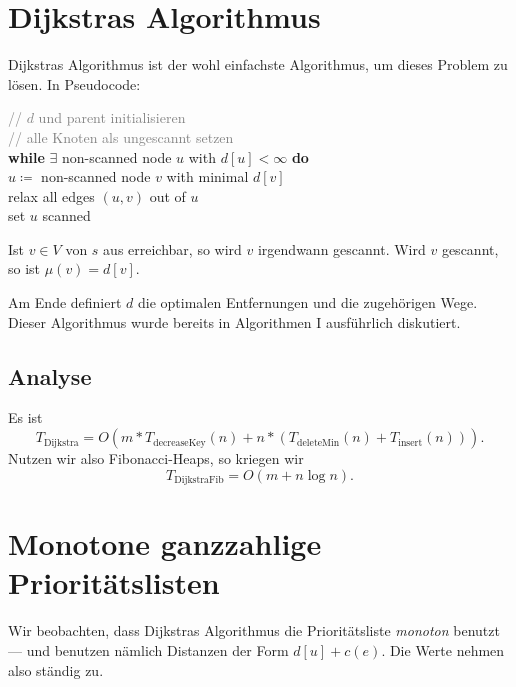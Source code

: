 \section{Dijkstras Algorithmus}

Dijkstras Algorithmus ist der wohl einfachste Algorithmus, um dieses Problem zu lösen. In Pseudocode:

\begin{pseudocode}
  \textcolor{gray}{// \( d \) und parent initialisieren} \\
  \textcolor{gray}{// alle Knoten als ungescannt setzen} \\
  \textbf{while} \( \exists \) non-scanned node \( u \) with \( d[u] < \infty \) \textbf{do} \\
  \phantom{\enskip} \( u \coloneqq \) non-scanned node \( v \) with minimal \( d[v] \) \\
  \phantom{\enskip} relax all edges \( (u,v) \) out of \( u \) \\
  \phantom{\enskip} set \( u \) scanned
\end{pseudocode}

Ist \( v \in V \) von \( s \) aus erreichbar, so wird \( v \) irgendwann gescannt. Wird \( v \) gescannt, so ist \( \mu(v) = d[v] \).

Am Ende definiert \( d \) die optimalen Entfernungen und  die zugehörigen Wege. Dieser Algorithmus wurde bereits in Algorithmen I ausführlich diskutiert.

\subsection{Analyse}

Es ist
\begin{equation*}
  T_{\text{Dijkstra}} = O(m*T_\text{decreaseKey}(n) + n*(T_\text{deleteMin}(n) + T_\text{insert}(n)))\text{.}
\end{equation*}
Nutzen wir also Fibonacci-Heaps, so kriegen wir
\begin{equation*}
  T_\text{DijkstraFib} = O(m+n\log n)\text{.}
\end{equation*}

\section{Monotone ganzzahlige Prioritätslisten}

Wir beobachten, dass Dijkstras Algorithmus die Prioritätsliste \emph{monoton} benutzt ---  und  benutzen nämlich Distanzen der Form \( d[u] + c(e) \). Die Werte nehmen also ständig zu.

